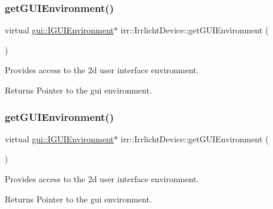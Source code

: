 \subsubsection{\texorpdfstring{get\+G\+U\+I\+Environment()}{getGUIEnvironment()}\hspace{0.1cm}{\footnotesize\ttfamily [1/2]}}
{\footnotesize\ttfamily virtual \hyperlink{classirr_1_1gui_1_1IGUIEnvironment}{gui\+::\+I\+G\+U\+I\+Environment}$\ast$ irr\+::\+Irrlicht\+Device\+::get\+G\+U\+I\+Environment (\begin{DoxyParamCaption}{ }\end{DoxyParamCaption})\hspace{0.3cm}{\ttfamily [pure virtual]}}



Provides access to the 2d user interface environment. 

\begin{DoxyReturn}{Returns}
Pointer to the gui environment. 
\end{DoxyReturn}
\mbox{\label{classirr_1_1IrrlichtDevice_af7491b8c5ef4f71360f30fbad90ae35c}} 
\subsubsection{\texorpdfstring{get\+G\+U\+I\+Environment()}{getGUIEnvironment()}\hspace{0.1cm}{\footnotesize\ttfamily [2/2]}}
{\footnotesize\ttfamily virtual \hyperlink{classirr_1_1gui_1_1IGUIEnvironment}{gui\+::\+I\+G\+U\+I\+Environment}$\ast$ irr\+::\+Irrlicht\+Device\+::get\+G\+U\+I\+Environment (\begin{DoxyParamCaption}{ }\end{DoxyParamCaption})\hspace{0.3cm}{\ttfamily [pure virtual]}}



Provides access to the 2d user interface environment. 

\begin{DoxyReturn}{Returns}
Pointer to the gui environment. 
\end{DoxyReturn}
\mbox{\label{classirr_1_1IrrlichtDevice_adec0b0b6b71b5066dd2c7039f1f4d85b}} 
